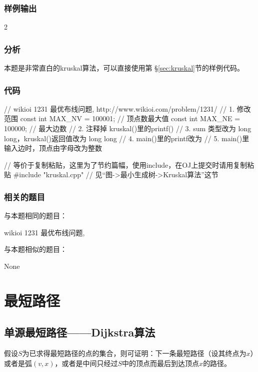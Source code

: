 \subsubsection{样例输出}
\begin{Code}
2
\end{Code}

\subsubsection{分析}
本题是非常直白的kruskal算法，可以直接使用第 \S \ref{sec:kruskal}节的样例代码。

\subsubsection{代码}
\begin{Codex}[label=wiring.c]
// wikioi 1231 最优布线问题, http://www.wikioi.com/problem/1231/
// 1. 修改范围
const int MAX_NV = 100001; // 顶点数最大值
const int MAX_NE = 100000;  // 最大边数
// 2. 注释掉 kruskal()里的printf()
// 3. sum 类型改为 long long，kruskal()返回值改为 long long
// 4. main()里的printf改为 %
// 5. main()里输入边时，顶点由字母改为整数

// 等价于复制粘贴，这里为了节约篇幅，使用include，在OJ上提交时请用复制粘贴
#include "kruskal.cpp"  // 见“图->最小生成树->Kruskal算法”这节
\end{Codex}

\subsubsection{相关的题目}
与本题相同的题目：
\begindot
\item wikioi 1231 最优布线问题, 
\myenddot

与本题相似的题目：
\begindot
\item None
\myenddot


\section{最短路径} %

\subsection{单源最短路径——Dijkstra算法}
\label{sec:dijkstra}

假设$S$为已求得最短路径的点的集合，则可证明：下一条最短路径（设其终点为$x$）或者是弧$(v, x)$，或者是中间只经过$S$中的顶点而最后到达顶点$x$的路径。

